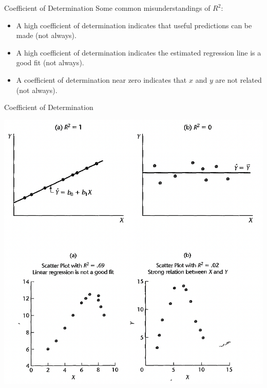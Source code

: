 \documentclass[
  ignorenonframetext,
]{beamer}
\begin{document}
\begin{frame}{Coefficient of Determination}
\protect\hypertarget{coefficient-of-determination-1}{}
Some common misunderstandings of \(R^2\):

\begin{itemize}
\item
  A high coefficient of determination indicates that useful predictions
  can be made (not always).
\item
  A high coefficient of determination indicates the estimated regression
  line is a good fit (not always).
\item
  A coefficient of determination near zero indicates that \(x\) and
  \(y\) are not related (not always).
\end{itemize}
\end{frame}

\begin{frame}{Coefficient of Determination}
\protect\hypertarget{coefficient-of-determination-2}{}
\begin{center}\includegraphics[width=0.6\linewidth]{week2_7} \end{center}
\end{frame}
\end{document}
